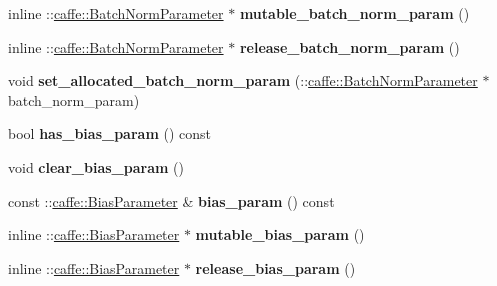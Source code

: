 \begin{DoxyCompactItemize}
inline \+::\mbox{\hyperlink{classcaffe_1_1_batch_norm_parameter}{caffe\+::\+Batch\+Norm\+Parameter}} $\ast$ {\bfseries mutable\+\_\+batch\+\_\+norm\+\_\+param} ()
\item 
\mbox{\label{classcaffe_1_1_layer_parameter_a12167ee3461e55160916d631195d03e4}} 
inline \+::\mbox{\hyperlink{classcaffe_1_1_batch_norm_parameter}{caffe\+::\+Batch\+Norm\+Parameter}} $\ast$ {\bfseries release\+\_\+batch\+\_\+norm\+\_\+param} ()
\item 
\mbox{\label{classcaffe_1_1_layer_parameter_a5f0101a591a38ef54b17f3f054821017}} 
void {\bfseries set\+\_\+allocated\+\_\+batch\+\_\+norm\+\_\+param} (\+::\mbox{\hyperlink{classcaffe_1_1_batch_norm_parameter}{caffe\+::\+Batch\+Norm\+Parameter}} $\ast$batch\+\_\+norm\+\_\+param)
\item 
\mbox{\label{classcaffe_1_1_layer_parameter_a3f2ac850b6d6bc7e2e6a0014bff9a365}} 
bool {\bfseries has\+\_\+bias\+\_\+param} () const
\item 
\mbox{\label{classcaffe_1_1_layer_parameter_a47c1a4aa599b868d13005a714a690ab0}} 
void {\bfseries clear\+\_\+bias\+\_\+param} ()
\item 
\mbox{\label{classcaffe_1_1_layer_parameter_ad2e4f6eb9b43456f10aec618628f3796}} 
const \+::\mbox{\hyperlink{classcaffe_1_1_bias_parameter}{caffe\+::\+Bias\+Parameter}} \& {\bfseries bias\+\_\+param} () const
\item 
\mbox{\label{classcaffe_1_1_layer_parameter_aaf12e4b580dbac7ac5386d044f5300f7}} 
inline \+::\mbox{\hyperlink{classcaffe_1_1_bias_parameter}{caffe\+::\+Bias\+Parameter}} $\ast$ {\bfseries mutable\+\_\+bias\+\_\+param} ()
\item 
\mbox{\label{classcaffe_1_1_layer_parameter_a59aee8fa63bfe18376bab0533209f84c}} 
inline \+::\mbox{\hyperlink{classcaffe_1_1_bias_parameter}{caffe\+::\+Bias\+Parameter}} $\ast$ {\bfseries release\+\_\+bias\+\_\+param} ()
\item 
\mbox{\label{classcaffe_1_1_layer_parameter_a3667579d7205f6e996df9e8b0fcdee68}} 

\end{DoxyCompactItemize}
